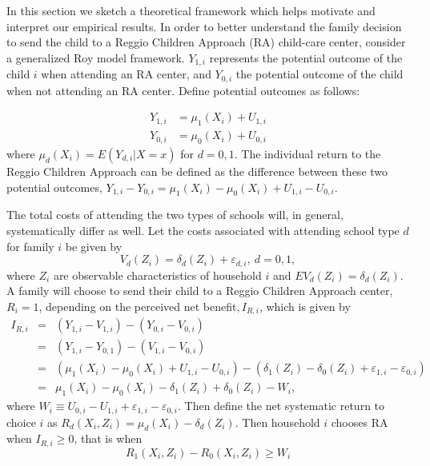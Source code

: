 
In this section we sketch a theoretical framework which helps motivate and interpret our empirical results. In order to better understand the family decision to send the child to a Reggio Children Approach (RA) child-care center, consider a generalized Roy model framework. $Y_{1,i}$ represents the potential outcome of the child $i$ when attending an RA center, and $Y_{0,i}$ the potential outcome of the child when not attending an RA center. Define potential outcomes as follows:

\begin{align*}
Y_{1,i}& =\mu_{1}(X_{i})+U_{1,i} \\
Y_{0,i}& =\mu_{0}(X_{i})+U_{0,i}
\end{align*}%
where $\mu_{d}(X_{i})=E(Y_{d,i}|X=x)$ for $d=0,1$. The individual return to the Reggio Children Approach can be defined as the difference between these two potential outcomes, $Y_{1,i}-Y_{0,i}=\mu_{1}(X_{i})-\mu_{0}(X_{i})+U_{1,i}-U_{0,i}$.

The total costs of attending the two types of schools will, in general, systematically differ as well. Let the costs associated with attending school type $d$ for family $i$ be given by
\begin{equation*}
V_{d}(Z_{i})=\delta_{d}(Z_{i})+\varepsilon_{d,i},\ d=0,1,
\end{equation*}%
where $Z_{i}$ are observable characteristics of household $i$ and $EV_{d}(Z_{i})=\delta_{d}(Z_{i}).$ A family will choose to send their child to a Reggio Children Approach center, $R_{i}=1$, depending on the perceived net benefit$,I_{R,i}$, which is given by
\begin{eqnarray*}
I_{R,i} &=&(Y_{1,i}-V_{1,i})-(Y_{0,i}-V_{0,i}) \\
&=&(Y_{1,i}-Y_{0,1})-(V_{1,i}-V_{0,i}) \\
&=&(\mu_{1}(X_{i})-\mu_{0}(X_{i})+U_{1,i}-U_{0,i})-(\delta_{1}(Z_{i})-\delta_{0}(Z_{i})+\varepsilon_{1,i}-\varepsilon_{0,i}) \\
&=&\mu_{1}(X_{i})-\mu_{0}(X_{i})-\delta_{1}(Z_{i})+\delta_{0}(Z_{i})-W_{i},
\end{eqnarray*}%
where $W_{i}\equiv U_{0,i}-U_{1,i}+\varepsilon_{1,i}-\varepsilon_{0,i}.$ Then define the net systematic return to choice $i$ as $R_{d}(X_{i},Z_{i})=\mu_{d}(X_{i})-\delta_{d}(Z_{i}).$ Then household $i$ chooses RA when $I_{R,i} \geq 0$, that is when \[R_{1}(X_{i},Z_{i}) - R_{0}(X_{i},Z_{i}) \geq W_{i}\]

